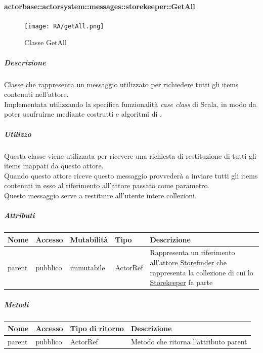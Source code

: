 \documentclass{scalatekids-article}
\begin{document}
\paragraph{actorbase::actorsystem::messages::storekeeper::GetAll}
\label{sec:actorbase::actorsystem::messages::storekeeper::GetAll}

\begin{figure}[H]
  \begin{center}
    \texttt{[image: RA/getAll.png]}
    \caption{Classe GetAll}
  \end{center}
\end{figure}

\subparagraph{Descrizione}
Classe che rappresenta un messaggio utilizzato per richiedere tutti gli items
contenuti nell'attore.\\Implementata utilizzando la specifica funzionalità \textit{case class} di Scala,
in modo da poter usufruirne mediante costrutti e algoritmi di
.

\subparagraph{Utilizzo}
Questa classe viene utilizzata per ricevere una richiesta di restituzione di
tutti gli items mappati da questo attore.\\Quando questo attore riceve questo
messaggio provvederà a inviare tutti gli items contenuti in esso al riferimento
all'attore passato come parametro.\\Questo messaggio serve a
restituire all'utente intere collezioni.

\subparagraph{Attributi}
\begin{tabular}{| p{2cm} | p{1.5cm} | p{2cm} | p{3cm} | p{8.5cm} |}
  \hline
  Nome & Accesso & Mutabilità & Tipo & Descrizione\\
  \hline
  parent & pubblico & immutabile & ActorRef & Rappresenta un riferimento all'attore \hyperref[sec:actorbase::actorsystem::actors::storefinder::Storefinder]{Storefinder} che rappresenta la collezione di cui lo \hyperref[sec:actorbase::actorsystem::actors::storekeeper::Storekeeper]{Storekeeper} fa parte\\
  \hline
\end{tabular}

\subparagraph{Metodi}
\begin{tabular}{| l | l | l | l |}
  \hline
  Nome & Accesso & Tipo di ritorno & Descrizione\\
  \hline
  parent & pubblico & ActorRef & Metodo che ritorna l'attributo parent\\
  \hline
\end{tabular}
\end{document}
